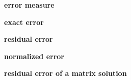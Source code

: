 \documentclass[letterpaper,reqno,oneside]{amsart}
\newenvironment{dd}[1]{
	\noindent
	\textbf{\normalsize{#1}}
	\hspace{0.1in}
	\small
	\rmfamily
	}
	{\medskip}
\begin{document}
\begin{dd}{error measure}

\end{dd}

\begin{dd}{exact error}

\end{dd}

\begin{dd}{residual error}

\end{dd}

\begin{dd}{normalized error}

\end{dd}

\begin{dd}{residual error of a matrix solution}

\end{dd}
\begin{dd}{}

\end{dd}
\end{document}
